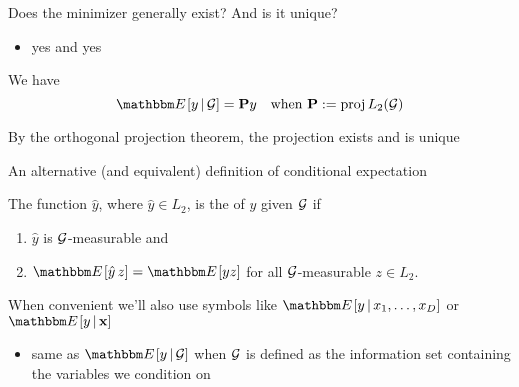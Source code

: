 \begin{frame}

    \vspace{2em}
    Does the minimizer generally exist? And is it unique?  
    \begin{itemize}
        \item yes and yes
    \end{itemize}
    
    \vspace{.7em}
    We have
    \begin{equation*}
        \EE[ y \given \gG] = \boldP y 
        \quad \text{when }  
        \boldP := \proj L_2(\gG)
    \end{equation*}
    
    \vspace{.7em}
    By the orthogonal projection theorem, the projection exists and is unique
    
\end{frame}

\begin{frame}

    \vspace{2em}
    An alternative (and equivalent) definition of
    conditional expectation
    
    The function $\hat y$, where $\hat y\in L_2$, is the  of $y$ given $\mathcal G$ if
    \begin{enumerate}
        \item $\hat y $ is $\mathcal G$-measurable and
        \item $\EE[\hat y  \, z] = \EE[yz]$ for all $\mathcal G$-measurable $z \in
            L_2$.
    \end{enumerate}
    
    \vspace{1em}
    When convenient we'll also use symbols like  
    $\EE[ y \given x_1, \ldots, x_D]$ or $\EE[y \given \boldx]$
    
    \begin{itemize}
        \item  same as $\EE[y \given \gG]$ when $\mathcal G$ is defined as the
        information set containing the variables we condition on
    \end{itemize}

\end{frame}

